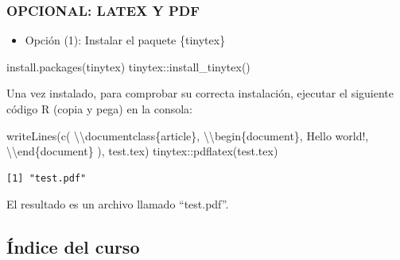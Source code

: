 \documentclass[
  letterpaper,
  DIV=11,
  numbers=noendperiod]{scrartcl}
\newenvironment{Shaded}{\begin{snugshade}}{\end{snugshade}}
\newcommand{\FunctionTok}[1]{\textcolor[rgb]{0.28,0.35,0.67}{#1}}
\newcommand{\NormalTok}[1]{\textcolor[rgb]{0.00,0.23,0.31}{#1}}
\newcommand{\SpecialCharTok}[1]{\textcolor[rgb]{0.37,0.37,0.37}{#1}}
\newcommand{\StringTok}[1]{\textcolor[rgb]{0.13,0.47,0.30}{#1}}
\providecommand{\tightlist}{%
  \setlength{\itemsep}{0pt}\setlength{\parskip}{0pt}}\usepackage{longtable,booktabs,array}
\begin{document}
\subsubsection{OPCIONAL: LATEX Y PDF}\label{opcional-latex-y-pdf}

\begin{itemize}
\tightlist
\item
  Opción (1): Instalar el paquete \{tinytex\}
\end{itemize}

\begin{Shaded}
\begin{Highlighting}[]
\FunctionTok{install.packages}\NormalTok{(}\StringTok{\textquotesingle{}tinytex\textquotesingle{}}\NormalTok{)}
\NormalTok{tinytex}\SpecialCharTok{::}\FunctionTok{install\_tinytex}\NormalTok{()}
\end{Highlighting}
\end{Shaded}

Una vez instalado, para comprobar su correcta instalación, ejecutar el
siguiente código R (copia y pega) en la consola:

\begin{Shaded}
\begin{Highlighting}[]
\FunctionTok{writeLines}\NormalTok{(}\FunctionTok{c}\NormalTok{(}
  \StringTok{\textquotesingle{}}\SpecialCharTok{\textbackslash{}\textbackslash{}}\StringTok{documentclass\{article\}\textquotesingle{}}\NormalTok{,}
  \StringTok{\textquotesingle{}}\SpecialCharTok{\textbackslash{}\textbackslash{}}\StringTok{begin\{document\}\textquotesingle{}}\NormalTok{, }\StringTok{\textquotesingle{}Hello world!\textquotesingle{}}\NormalTok{, }\StringTok{\textquotesingle{}}\SpecialCharTok{\textbackslash{}\textbackslash{}}\StringTok{end\{document\}\textquotesingle{}}
\NormalTok{), }\StringTok{\textquotesingle{}test.tex\textquotesingle{}}\NormalTok{)}
\NormalTok{tinytex}\SpecialCharTok{::}\FunctionTok{pdflatex}\NormalTok{(}\StringTok{\textquotesingle{}test.tex\textquotesingle{}}\NormalTok{)}
\end{Highlighting}
\end{Shaded}

\begin{verbatim}
[1] "test.pdf"
\end{verbatim}

El resultado es un archivo llamado ``test.pdf''.

\subsection{Índice del curso}\label{uxedndice-del-curso}
\end{document}
